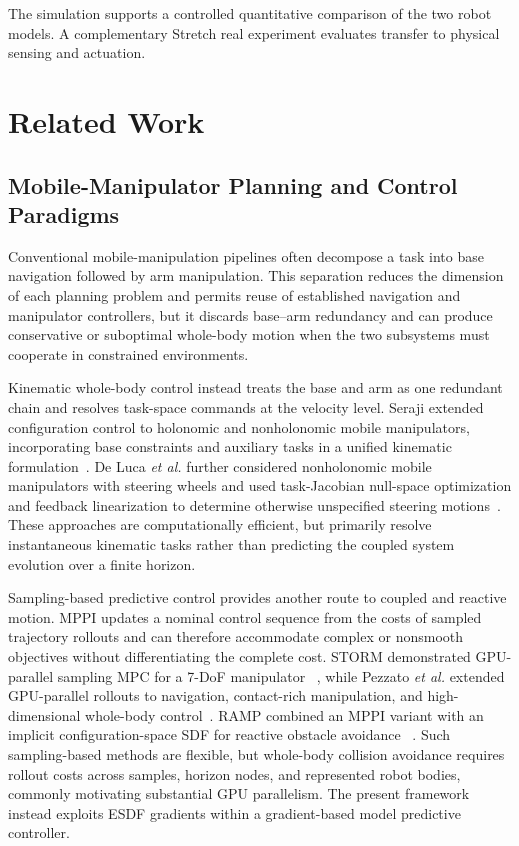 \documentclass[conference]{IEEEtran}
\begin{document}
The simulation supports a controlled quantitative comparison of the two robot models.
A complementary Stretch real experiment evaluates transfer to physical sensing and
actuation.

\section{Related Work}

\subsection{Mobile-Manipulator Planning and Control Paradigms}

Conventional mobile-manipulation pipelines often decompose a task into base
navigation followed by arm manipulation.  This separation reduces the
dimension of each planning problem and permits reuse of established navigation
and manipulator controllers, but it discards base--arm redundancy and can
produce conservative or suboptimal whole-body motion when the two subsystems
must cooperate in constrained environments.

Kinematic whole-body control instead treats the base and arm as one redundant
chain and resolves task-space commands at the velocity level.  Seraji extended
configuration control to holonomic and nonholonomic mobile manipulators,
incorporating base constraints and auxiliary tasks in a unified kinematic
formulation~\cite{seraji1998unified}.  De Luca \emph{et al.} further considered
nonholonomic mobile manipulators with steering wheels and used task-Jacobian
null-space optimization and feedback linearization to determine otherwise
unspecified steering motions~\cite{deluca2010kinematic}.  These approaches are
computationally efficient, but primarily resolve instantaneous kinematic tasks
rather than predicting the coupled system evolution over a finite horizon.

Sampling-based predictive control provides another route to coupled and
reactive motion.  MPPI updates a nominal control sequence from the costs of
sampled trajectory rollouts and can therefore accommodate complex or
nonsmooth objectives without differentiating the complete cost.  STORM
demonstrated GPU-parallel sampling MPC for a 7-DoF manipulator
~\cite{bhardwaj2022storm}, while Pezzato \emph{et al.} extended GPU-parallel
rollouts to navigation, contact-rich manipulation, and high-dimensional
whole-body control~\cite{pezzato2025sampling}.  RAMP combined an MPPI variant
with an implicit configuration-space SDF for reactive obstacle avoidance
~\cite{vasilopoulos2023ramp}.  Such sampling-based methods are flexible, but
whole-body collision avoidance requires rollout costs across samples, horizon
nodes, and represented robot bodies, commonly motivating substantial GPU
parallelism.  The present framework instead exploits ESDF gradients within a
gradient-based model predictive controller.
\end{document}
